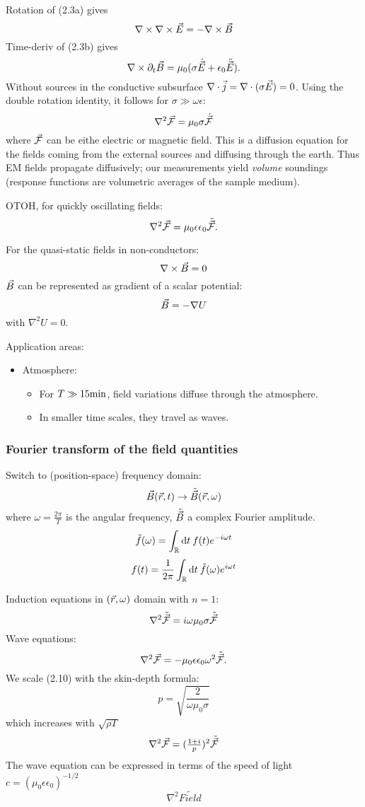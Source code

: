 Rotation of (2.3a) gives \[
  \nabla\times\nabla\times\vec{E} = -\nabla\times\vec{B}
\] Time-deriv of (2.3b) gives \[
  \nabla\times\partial_t\vec{B} = \mu_0(\sigma\dot{\vec{E}} + \epsilon_0\ddot{\vec{E}}).
\] Without sources in the conductive subsurface
\(\nabla\cdot\vec{j} = \nabla\cdot(\sigma\vec{E}) = 0\). Using the double
rotation identity, it follows for \(\sigma\gg\omega\epsilon\): \setcounter{equation}{6}\[
  \nabla^2\vec{\mathcal{F}} = \mu_0 \sigma \dot{\vec{\mathcal{F}}}
\] where \(\vec{\mathcal{F}}\) can be eithe electric or magnetic field. This is a
diffusion equation for the fields coming from the external sources and
diffusing through the earth. Thus EM fields propagate diffusively; our
measurements yield \emph{volume} soundings (response functions are
volumetric averages of the sample medium).

OTOH, for quickly oscillating fields: \setcounter{equation}{7}\[
  \nabla^2\vec{\mathcal{F}} = \mu_0\epsilon\epsilon_0\ddot{\vec{\mathcal{F}}}.
\]

For the quasi-static fields in non-conductors: \[
  \nabla\times\vec{B} = 0
\] \(\vec{B}\) can be represented as gradient of a scalar potential: \[
  \vec{B} = -\nabla U
\] with \(\nabla^2 U = 0\).

Application areas:

\begin{itemize}
\tightlist
\item
  Atmosphere:

  \begin{itemize}
  \tightlist
  \item
    For \(T\gg15\mathrm{min}\), field variations diffuse through the
    atmosphere.
  \item
    In smaller time scales, they travel as waves.
  \end{itemize}
\end{itemize}

\subsubsection{Fourier transform of the field
quantities}\label{fourier-transform-of-the-field-quantities}

Switch to (position-space) frequency domain: \[
  \vec{B}(\vec{r},t) \to \tilde{\vec{B}}(\vec{r}, \omega)
\] where \(\omega=\frac{2\pi}T\) is the angular frequency,
\(\tilde{\vec{B}}\) a complex Fourier amplitude. \[
  \tilde f(\omega) = \int_\mathbb{R}\mathrm{d}{t}\: f(t)e^{-i\omega t}
\] \[
  f(t) = \frac1{2\pi}\int_\mathbb{R}\mathrm{d}{t}\: \tilde f(\omega)e^{i\omega t}
\]

Induction equations in \((\vec{r},\omega)\) domain with \(n=1\): \setcounter{equation}{10}\[
  \nabla^2\tilde{\vec{\mathcal{F}}} = i\omega\mu_0\sigma\tilde{\vec{\mathcal{F}}}
\] Wave equations: \[
  \nabla^2\vec{\mathcal{F}} = -\mu_0\epsilon\epsilon_0\omega^2\tilde{\vec{\mathcal{F}}}.
\] We scale (2.10) with the skin-depth formula: \[
  p = \sqrt{\frac{2}{\omega\mu_0\sigma}}
\] which increases with \(\sqrt{\rho T}\) \[
  \nabla^2\vec{\mathcal{F}} = (\tfrac{1+i}{p})^2\tilde{\vec{\mathcal{F}}}
\] The wave equation can be expressed in terms of the speed of light
\(c = (\mu_0\epsilon\epsilon_0)^{-1/2}\) \[
  \nabla^2\tilde{Field}
\]

